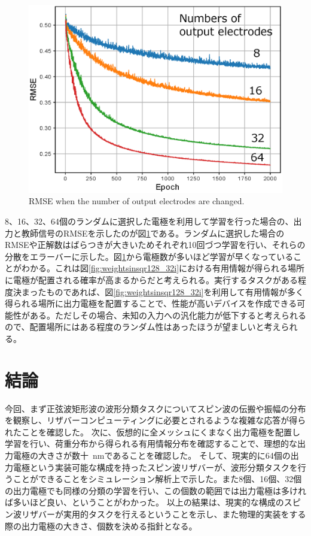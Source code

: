 \documentclass[a4j, twocolumn]{jsarticle}
\begin{document}
\begin{figure}
\centering
\includegraphics[width=1\hsize]{./figures/remsevs_r2.eps} 
\caption{RMSE when the number of output electrodes are changed.}
\label{fig:rmsevs}
\end{figure}

8、16、32、64個のランダムに選択した電極を利用して学習を行った場合の、出力と教師信号のRMSEを示したのが図\ref{fig:rmsevs}である。ランダムに選択した場合のRMSEや正解数はばらつきが大きいためそれぞれ10回づつ学習を行い、それらの分散をエラーバーに示した。図\ref{fig:rmsevs}から電極数が多いほど学習が早くなっていることがわかる。これは図\ref{fig:weightsinsqr128_32i}における有用情報が得られる場所に電極が配置される確率が高まるからだと考えられる。実行するタスクがある程度決まったものであれば、図\ref{fig:weightsinsqr128_32i}を利用して有用情報が多く得られる場所に出力電極を配置することで、性能が高いデバイスを作成できる可能性がある。ただしその場合、未知の入力への汎化能力が低下すると考えられるので、配置場所にはある程度のランダム性はあったほうが望ましいと考えられる。

\section{結論}
\label{sec:conclusion}
今回、まず正弦波矩形波の波形分類タスクについてスピン波の伝搬や振幅の分布を観察し、リザバーコンピューティングに必要とされるような複雑な応答が得られたことを確認した。
次に、仮想的に全メッシュにくまなく出力電極を配置し学習を行い、荷重分布から得られる有用情報分布を確認することで、理想的な出力電極の大きさが数十~nmであることを確認した。
そして、現実的に64個の出力電極という実装可能な構成を持ったスピン波リザバーが、波形分類タスクを行うことができることをシミュレーション解析上で示した。また8個、16個、32個の出力電極でも同様の分類の学習を行い、この個数の範囲では出力電極は多ければ多いほど良い、ということがわかった。
以上の結果は、現実的な構成のスピン波リザバーが実用的タスクを行えるということを示し、また物理的実装をする際の出力電極の大きさ、個数を決める指針となる。
\end{document}
